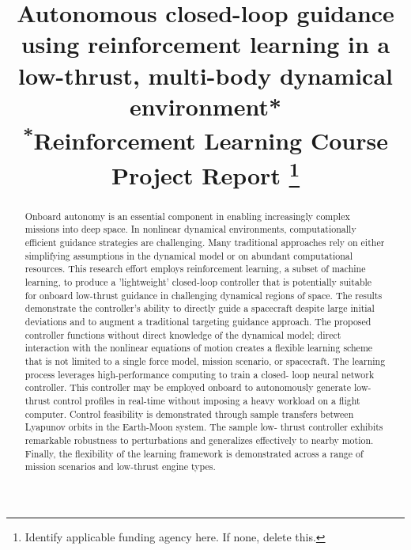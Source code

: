 \documentclass[conference]{IEEEtran}
\begin{document}
\title{Autonomous closed-loop guidance using reinforcement learning in a low-thrust, multi-body dynamical environment*\\
{\footnotesize \textsuperscript{*}Reinforcement Learning Course Project Report}
\thanks{Identify applicable funding agency here. If none, delete this.}
}

\author{
\and
{}
}

\maketitle

\begin{abstract}
    Onboard autonomy is an essential component in enabling increasingly complex missions into deep space. In nonlinear dynamical environments, computationally efficient guidance strategies are challenging. Many traditional approaches rely on either simplifying assumptions in the dynamical model or on abundant computational resources. This research effort employs reinforcement learning, a subset of machine learning, to produce a 'lightweight' closed-loop controller that is potentially suitable for onboard low-thrust guidance in challenging dynamical regions of space. The results demonstrate the controller's ability to directly guide a spacecraft despite large initial deviations and to augment a traditional targeting guidance approach. The proposed controller functions without direct knowledge of the dynamical model; direct interaction with the nonlinear equations of motion creates a flexible learning scheme that is not limited to a single force model, mission scenario, or spacecraft. The learning process leverages high-performance computing to train a closed- loop neural network controller. This controller may be employed onboard to autonomously generate low-thrust control profiles in real-time without imposing a heavy workload on a flight computer. Control feasibility is demonstrated through sample transfers between Lyapunov orbits in the Earth-Moon system. The sample low- thrust controller exhibits remarkable robustness to perturbations and generalizes effectively to nearby motion. Finally, the flexibility of the learning framework is demonstrated across a range of mission scenarios and low-thrust engine types.
\end{abstract}
\end{document}
